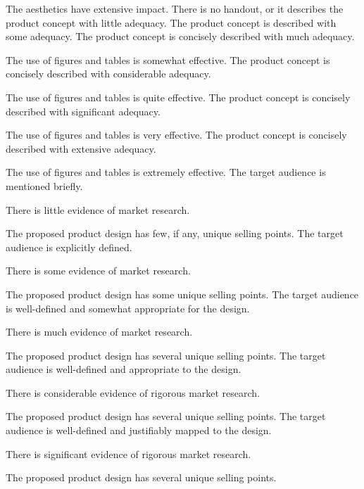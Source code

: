 \documentclass{../fal_assignment}
\begin{document}
\begin{markingrubric}
            \par The aesthetics have extensive impact.
%
        \grade\fail There is no handout, or it describes the product concept with little adequacy.
        \grade The product concept is described with some adequacy.
        \grade The product concept is concisely described with much adequacy.
            \par The use of figures and tables is somewhat effective.
        \grade The product concept is concisely described with considerable adequacy.
            \par The use of figures and tables is quite effective.
        \grade The product concept is concisely described with significant adequacy.
            \par The use of figures and tables is very effective.
        \grade The product concept is concisely described with extensive adequacy.
            \par The use of figures and tables is extremely effective.
%
        \grade \fail The target audience is mentioned briefly.
            \par There is little evidence of market research.
            \par The proposed product design has few, if any, unique selling points.
        \grade The target audience is explicitly defined.
            \par There is some evidence of market research.
            \par The proposed product design has some unique selling points.
        \grade The target audience is well-defined and somewhat appropriate for the design.
            \par There is much evidence of market research.
            \par The proposed product design has several unique selling points.
        \grade The target audience is well-defined and appropriate to the design.
            \par There is considerable evidence of rigorous market research.
            \par The proposed product design has several unique selling points.
        \grade The target audience is well-defined and justifiably mapped to the design.
            \par There is significant evidence of rigorous market research.
            \par The proposed product design has several unique selling points.

\end{markingrubric}
\end{document}
